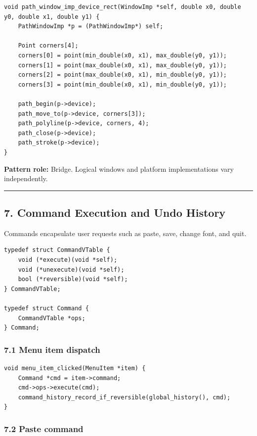 \documentclass[11pt]{article}
\begin{document}
\begin{verbatim}
void path_window_imp_device_rect(WindowImp *self, double x0, double y0, double x1, double y1) {
    PathWindowImp *p = (PathWindowImp*) self;

    Point corners[4];
    corners[0] = point(min_double(x0, x1), max_double(y0, y1));
    corners[1] = point(max_double(x0, x1), max_double(y0, y1));
    corners[2] = point(max_double(x0, x1), min_double(y0, y1));
    corners[3] = point(min_double(x0, x1), min_double(y0, y1));

    path_begin(p->device);
    path_move_to(p->device, corners[3]);
    path_polyline(p->device, corners, 4);
    path_close(p->device);
    path_stroke(p->device);
}
\end{verbatim}

\textbf{Pattern role:} Bridge. Logical windows and platform implementations vary independently.

\begin{center}\rule{0.5\linewidth}{0.5pt}\end{center}

\subsection{7. Command Execution and Undo History}\label{command-execution-and-undo-history}

Commands encapsulate user requests such as paste, save, change font, and quit.

\begin{verbatim}
typedef struct CommandVTable {
    void (*execute)(void *self);
    void (*unexecute)(void *self);
    bool (*reversible)(void *self);
} CommandVTable;

typedef struct Command {
    CommandVTable *ops;
} Command;
\end{verbatim}

\subsubsection{7.1 Menu item dispatch}\label{menu-item-dispatch}

\begin{verbatim}
void menu_item_clicked(MenuItem *item) {
    Command *cmd = item->command;
    cmd->ops->execute(cmd);
    command_history_record_if_reversible(global_history(), cmd);
}
\end{verbatim}

\subsubsection{7.2 Paste command}\label{paste-command}
\end{document}
